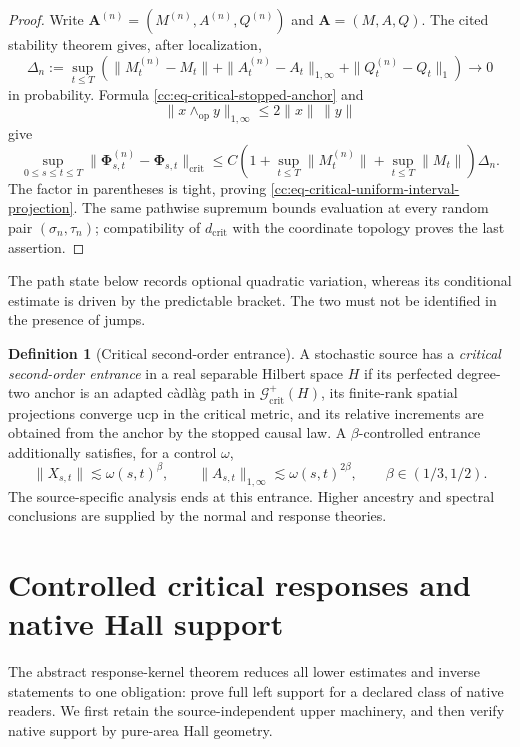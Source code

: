 \documentclass[10pt,reqno]{amsart}
\theoremstyle{plain}
\theoremstyle{definition}
\newtheorem{definition}[theorem]{Definition}
\theoremstyle{remark}
\begin{document}
\begin{proof}
Write
\(\mathbf A^{(n)}=(M^{(n)},A^{(n)},Q^{(n)})\) and
\(\mathbf A=(M,A,Q)\).  The cited stability theorem gives, after
localization,
\[
 \Delta_n:=\sup_{t\leq T}\left(
 \|M_t^{(n)}-M_t\|+
 \|A_t^{(n)}-A_t\|_{1,\infty}+
 \|Q_t^{(n)}-Q_t\|_1\right)\longrightarrow0
\]
in probability.  Formula \eqref{cc:eq-critical-stopped-anchor} and
\[
 \|x\wedge_{\mathrm{op}}y\|_{1,\infty}
 \leq2\|x\|\,\|y\|
\]
give
\[
 \sup_{0\leq s\leq t\leq T}
 \|\mathbf\Phi^{(n)}_{s,t}-\mathbf\Phi_{s,t}\|_{\mathrm{crit}}
 \leq
 C\left(1+\sup_{t\leq T}\|M_t^{(n)}\|
          +\sup_{t\leq T}\|M_t\|\right)\Delta_n.
\]
The factor in parentheses is tight, proving
\eqref{cc:eq-critical-uniform-interval-projection}.  The same pathwise
supremum bounds evaluation at every random pair
\((\sigma_n,\tau_n)\); compatibility of \(d_{\mathrm{crit}}\) with the
coordinate topology proves the last assertion.
\end{proof}

The path state below records optional quadratic variation, whereas its
conditional estimate is driven by the predictable bracket.  The two must
not be identified in the presence of jumps.



\begin{definition}[Critical second-order entrance]
\label{cc:def-critical-second-order-entrance}
A stochastic source has a \emph{critical second-order entrance} in a real
separable Hilbert space \(H\) if its perfected degree-two anchor is an
adapted c\`adl\`ag path in \(\mathscr G^+_{\mathrm{crit}}(H)\), its
finite-rank spatial projections converge ucp in the critical metric, and its
relative increments are obtained from the anchor by the stopped causal law.
A \(\beta\)-controlled entrance additionally satisfies, for a control
\(\omega\),
\[
 \|X_{s,t}\|\lesssim\omega(s,t)^\beta,
 \qquad
 \|A_{s,t}\|_{1,\infty}\lesssim\omega(s,t)^{2\beta},
 \qquad \beta\in(1/3,1/2).
\]
The source-specific analysis ends at this entrance.  Higher ancestry and
spectral conclusions are supplied by the normal and response theories.
\end{definition}
\section{Controlled critical responses and native Hall support}
\label{hall:sec-native}

The abstract response-kernel theorem reduces all lower estimates and inverse
statements to one obligation: prove full left support for a declared class of
native readers.  We first retain the source-independent upper machinery, and
then verify native support by pure-area Hall geometry.
\end{document}
